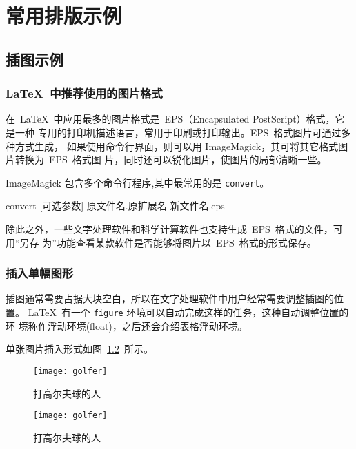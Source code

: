 \chapter{常用排版示例}
\label{cha:example}

\section{插图示例}
\label{sec:figure}

\subsection{\LaTeX~中推荐使用的图片格式}

在~\LaTeX~中应用最多的图片格式是~EPS（Encapsulated PostScript）格式，它是一种
专用的打印机描述语言，常用于印刷或打印输出。EPS~格式图片可通过多种方式生成，
如果使用命令行界面，则可以用 ImageMagick，其可将其它格式图片转换为~EPS~格式图
片，同时还可以锐化图片，使图片的局部清晰一些。

ImageMagick 包含多个命令行程序,其中最常用的是 \texttt{convert}。
\begin{shell}
convert [可选参数] 原文件名.原扩展名 新文件名.eps
\end{shell}

除此之外，一些文字处理软件和科学计算软件也支持生成~EPS~格式的文件，可用“另存
为”功能查看某款软件是否能够将图片以~EPS~格式的形式保存。

\subsection{插入单幅图形}

插图通常需要占据大块空白，所以在文字处理软件中用户经常需要调整插图的位置。
\LaTeX~有一个 \texttt{figure} 环境可以自动完成这样的任务，这种自动调整位置的环
境称作浮动环境(float)，之后还会介绍表格浮动环境。

单张图片插入形式如图~\ref{fig:golfer}~所示。
\begin{figure}[htbp]
\centering
\texttt{[image: golfer]}
\caption{打高尔夫球的人}
\label{fig:golfer}
\end{figure}

\begin{latex}
\begin{figure}[htbp]
\centering
\texttt{[image: golfer]}
\caption{打高尔夫球的人}
\label{fig:golfer}%
\end{figure}
\end{latex}

